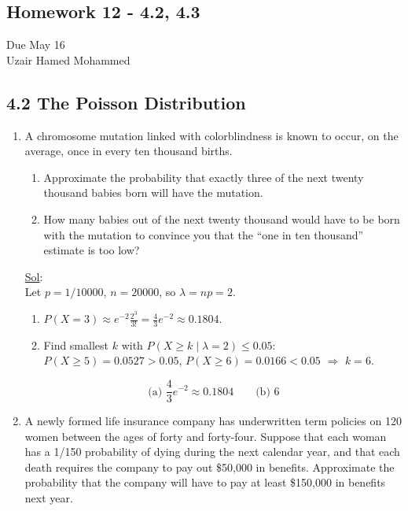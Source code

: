 \begin{center}
	\section*{Homework 12 - 4.2, 4.3}
	Due May 16 \\
	Uzair Hamed Mohammed
\end{center}


\subsection*{4.2 The Poisson Distribution}
\begin{enumerate}
	\item[4.] A chromosome mutation linked with colorblindness is known to occur, on the average, once in every ten thousand births.
	      \begin{enumerate}
		      \item Approximate the probability that exactly three of the next twenty thousand babies born will have the mutation.
		      \item How many babies out of the next twenty thousand would have to be born with the mutation to convince you that the “one in ten thousand” estimate is too low?
	      \end{enumerate}

	      \underline{Sol}: \\

	      \noindent Let $p = 1/10000$, $n=20000$, so $\lambda = np = 2$.

	      \begin{enumerate}
		      \item $P(X=3) \approx e^{-2} \frac{2^3}{3!} = \frac{4}{3}e^{-2} \approx 0.1804$.
		      \item Find smallest $k$ with $P(X \ge k \mid \lambda=2) \le 0.05$:
		            $P(X\ge5)=0.0527>0.05$, $P(X\ge6)=0.0166<0.05$ $\Rightarrow$ $k=6$.
	      \end{enumerate}

	      \[
		      \boxed{\text{(a) } \frac{4}{3}e^{-2} \approx 0.1804 \qquad \text{(b) } 6}
	      \]

	\item[6.] A newly formed life insurance company has underwritten term policies on 120 women between the ages of forty and forty-four. Suppose that each woman has a 1/150 probability of dying during the next calendar year, and that each death requires the company to pay out \$50,000 in benefits. Approximate the probability that the company will have to pay at least \$150,000 in benefits next year.


\end{enumerate}
